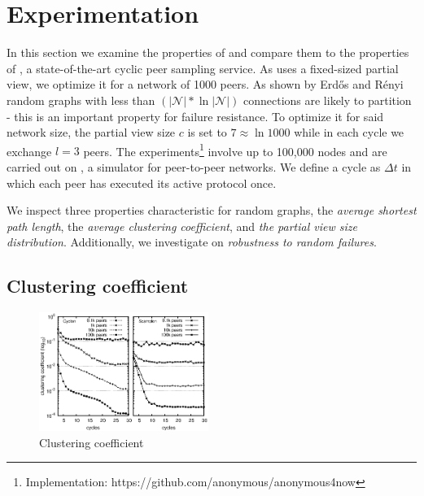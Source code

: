 
\section{Experimentation}
\label{sec:experiments}
In this section we examine the properties of \SCAMPLON{} and 
compare them to the properties of \CYCLON{}, a state-of-the-art cyclic peer sampling service.
As \CYCLON{} uses a fixed-sized partial view, we optimize it for a network of 1000 peers.
As shown by Erd{\H o}s and R{\' e}nyi\cite{erdos1959random} random graphs with less than 
$(|\mathcal{N}|*\ln|\mathcal{N}|)$ connections are likely to partition - 
this is an important property for failure resistance.
To optimize it for said network size, the partial view size $c$ is set to $7\approx \ln{1000}$
while in each cycle we exchange $l=3$ peers.
The experiments\footnote{Implementation: https://github.com/anonymous/anonymous4now}
involve up to 100,000 nodes and are carried out on \PEERSIM{} \cite{peersim}, 
a simulator for peer-to-peer networks.
We define a cycle as $\Delta t$ in which each peer has executed its active protocol once.

We inspect three properties characteristic for random graphs, 
the \emph{average shortest path length}, the \emph{average clustering coefficient},
and \emph{the partial view size distribution}. Additionally, we investigate on
\emph{robustness to random failures}.

\subsection{Clustering coefficient}

\begin{figure}
    \centering
    \includegraphics[width=0.49\textwidth]{img/cluster.eps}
    \caption{Clustering coefficient}
    \label{fig:clustering}
\end{figure}


